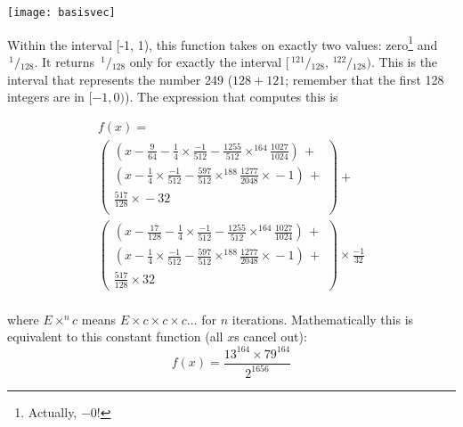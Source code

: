 \documentclass[twocolumn]{article}
\newcommand\sfrac[2]{\!{}\,^{#1}\!/{}\!_{#2}}
\begin{document}
\texttt{[image: basisvec]}


Within the interval [-1, 1), this function takes on exactly two
  values: zero\footnote{Actually, $-0$!} and $\sfrac{1}{128}$. It returns
  $\sfrac{1}{128}$ only for exactly the interval $[\sfrac{121}{128},
    \sfrac{122}{128})$. This is the interval that represents the
  number 249 ($128 + 121$; remember that the first 128 integers are in
  $[-1, 0)$). The expression that computes this is

\[
\begin{array}{l}
  f(x) = \\[0.5em]
  \left(
  \begin{array}{l}
    (x - \frac{9}{64} - \frac{1}{4} \times{} \frac{-1}{512} - \frac{1255}{512} \times^{\scriptscriptstyle 164} \frac{1027}{1024})\, + \\[0.5em]
    (x - \frac{1}{4} \times{} \frac{-1}{512} - \frac{597}{512} \times^{\scriptscriptstyle 188} \frac{1277}{2048} \times{} -\!1)\, + \\[0.5em]
    \frac{517}{128} \times{} -32 \\[0.5em]
  \end{array}
  \right) + \\[2em]
%
  \left(
  \begin{array}{l}
    (x - \frac{17}{128} - \frac{1}{4} \times{} \frac{-1}{512} - \frac{1255}{512} \times^{\scriptscriptstyle 164} \frac{1027}{1024})\, + \\[0.5em]
    (x - \frac{1}{4} \times{} \frac{-1}{512} - \frac{597}{512} \times^{\scriptscriptstyle 188} \frac{1277}{2048} \times{} -\!1)\, + \\[0.5em]
    \frac{517}{128} \times{} 32
  \end{array}
  \right) \times{} \frac{-1}{32} \\
\end{array}
\]

\noindent where $E \times^{n} c$ means $E \times c \times c \times c \ldots$ for $n$ iterations.
Mathematically this is equivalent to this constant function (all $x$s cancel out):
$$f(x) = \frac{13^{164} \times{} 79^{164}}{2^{1656}}$$
\end{document}
